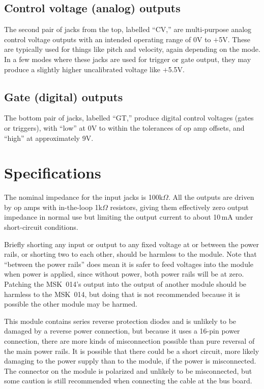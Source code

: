 \subsection{Control voltage (analog) outputs}

The second pair of jacks from the top, labelled ``CV,'' are multi-purpose
analog control voltage outputs with an intended operating range of 0V to
$+$5V.  These are typically used for things like pitch and velocity, again
depending on the mode.  In a few modes where these jacks are used for
trigger or gate output, they may produce a slightly higher uncalibrated
voltage like $+$5.5V.

\subsection{Gate (digital) outputs}

The bottom pair of jacks, labelled ``GT,'' produce digital control voltages
(gates or triggers), with ``low'' at 0V to within the tolerances of op amp
offsets, and ``high'' at approximately 9V.

\section{Specifications}

The nominal impedance for the input jacks is 100k$\Omega$.  All the outputs
are driven by op amps with in-the-loop 1k$\Omega$ resistors, giving them
effectively zero output impedance in normal use but limiting the output
current to about 10\,mA under short-circuit conditions.

Briefly shorting any input or output to any fixed voltage at or between the
power rails, or shorting two to each other, should be harmless to the
module.  Note that ``between the power rails'' does mean it is safer to feed
voltages into the module when power is applied, since without power, both
power rails will be at zero.  Patching the MSK~014's output into the output
of another module should be harmless to the MSK~014, but doing that is not
recommended because it is possible the other module may be harmed.

This module contains series reverse protection diodes and is unlikely to be
damaged by a reverse power connection, but because it uses a 16-pin power
connection, there are more kinds of misconnection possible than pure reversal
of the main power rails.  It is possible that there could be a short
circuit, more likely damaging to the power supply than to the module, if the
power is misconnected.  The connector on the module is polarized and
unlikely to be misconnected, but some caution is still recommended when
connecting the cable at the bus board.

